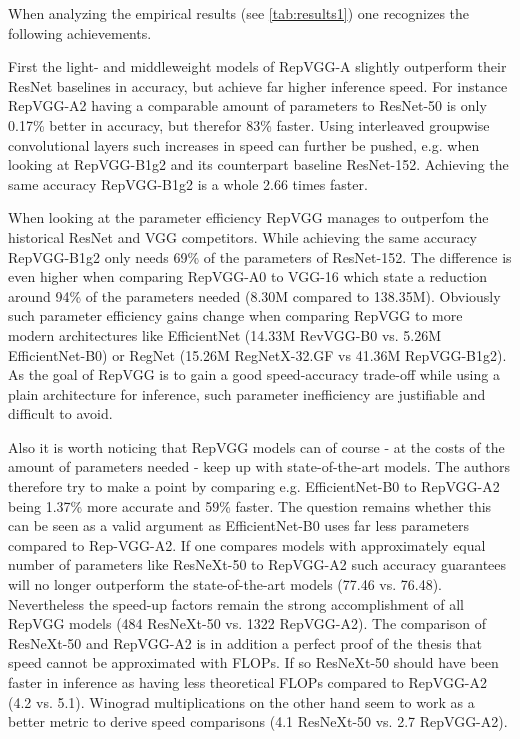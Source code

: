 When analyzing the empirical results (see \autoref{tab:results1}) one recognizes the following achievements. 

First the light- and middleweight models of RepVGG-A slightly outperform their ResNet baselines in accuracy, but achieve far higher inference speed. For instance RepVGG-A2 having a comparable amount of parameters to ResNet-50 is only 0.17\% better in accuracy, but therefor 83\% faster. Using interleaved groupwise convolutional layers such increases in speed can further be pushed, e.g. when looking at RepVGG-B1g2 and its counterpart baseline ResNet-152. Achieving the same accuracy RepVGG-B1g2 is a whole 2.66 times faster. 

When looking at the parameter efficiency RepVGG manages to outperfom the historical ResNet and VGG competitors. While achieving the same accuracy RepVGG-B1g2 only needs 69\% of the parameters of ResNet-152. The difference is even higher when comparing RepVGG-A0 to VGG-16 which state a reduction around 94\% of the parameters needed (8.30M compared to 138.35M). Obviously such parameter efficiency gains change when comparing RepVGG to more modern architectures like EfficientNet (14.33M RevVGG-B0 vs. 5.26M EfficientNet-B0) or RegNet (15.26M RegNetX-32.GF vs 41.36M RepVGG-B1g2). As the goal of RepVGG is to gain a good speed-accuracy trade-off while using a plain architecture for inference, such parameter inefficiency are justifiable and difficult to avoid. 

Also it is worth noticing that RepVGG models can of course - at the costs of the amount of parameters needed - keep up with state-of-the-art models. The authors therefore try to make a point by comparing e.g. EfficientNet-B0 to RepVGG-A2 being 1.37\% more accurate and 59\% faster. The question remains whether this can be seen as a valid argument as EfficientNet-B0 uses far less parameters compared to Rep-VGG-A2. If one compares models with approximately equal number of parameters like ResNeXt-50 to RepVGG-A2 such accuracy guarantees will no longer outperform the state-of-the-art models (77.46 vs. 76.48). Nevertheless the speed-up factors remain the strong accomplishment of all RepVGG models (484 ResNeXt-50 vs. 1322 RepVGG-A2). The comparison of ResNeXt-50 and RepVGG-A2 is in addition a perfect proof of the thesis that speed cannot be approximated with FLOPs. If so ResNeXt-50 should have been faster in inference as having less theoretical FLOPs compared to RepVGG-A2 (4.2 vs. 5.1). Winograd multiplications on the other hand seem to work as a better metric to derive speed comparisons (4.1 ResNeXt-50 vs. 2.7 RepVGG-A2). 

